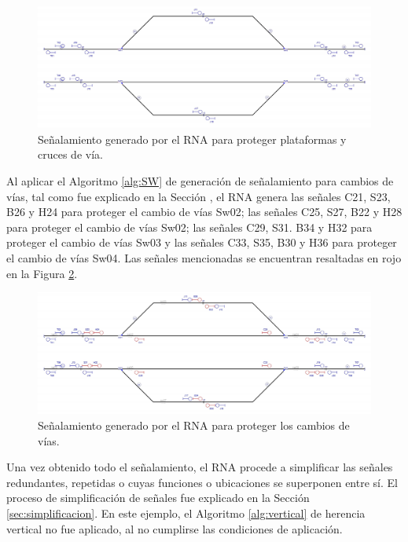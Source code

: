 	\begin{figure}[H]
		\centering
		\includegraphics[width=1\textwidth]{resultados-obtenidos/ejemplo5/images/5_step3.png}
		\centering\caption{Señalamiento generado por el RNA para proteger plataformas y cruces de vía.}
		\label{fig:EJ5_5}
	\end{figure}
	
	Al aplicar el Algoritmo \ref{alg:SW} de generación de señalamiento para cambios de vías, tal como fue explicado en la Sección \label{sec:signal_switches}, el RNA genera las señales C21, S23, B26 y H24 para proteger el cambio de vías Sw02; las señales C25, S27, B22 y H28 para proteger el cambio de vías Sw02; las señales C29, S31. B34 y H32 para proteger el cambio de vías Sw03 y las señales C33, S35, B30 y H36 para proteger el cambio de vías Sw04. Las señales mencionadas se encuentran resaltadas en rojo en la Figura \ref{fig:EJ5_6}.
	
	\begin{figure}[H]
		\centering
		\includegraphics[width=1\textwidth]{resultados-obtenidos/ejemplo5/images/5_step4.png}
		\centering\caption{Señalamiento generado por el RNA para proteger los cambios de vías.}
		\label{fig:EJ5_6}
	\end{figure}
	
	Una vez obtenido todo el señalamiento, el RNA procede a simplificar las señales redundantes, repetidas o cuyas funciones o ubicaciones se superponen entre sí. El proceso de simplificación de señales fue explicado en la Sección \ref{sec:simplificacion}. En este ejemplo, el Algoritmo \ref{alg:vertical} de herencia vertical no fue aplicado, al no cumplirse las condiciones de aplicación.
	
